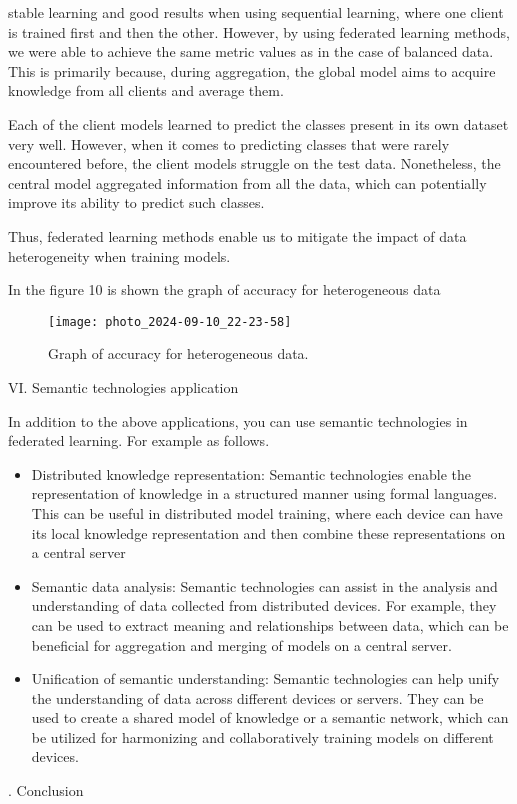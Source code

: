 \documentclass[twocolumn, 10pt]{article}
\newcommand{\RomanNumeralCaps}[1]
    {\MakeUppercase{\romannumeral #1}}
\begin{document}
\noindent stable learning and good results when using sequential %
learning, where one client is trained first and then the
other. However, by using federated learning methods, we
were able to achieve the same metric values as in the
case of balanced data. This is primarily because, during
aggregation, the global model aims to acquire knowledge
from all clients and average them.

Each of the client models learned to predict the classes
present in its own dataset very well. However, when it
comes to predicting classes that were rarely encountered
before, the client models struggle on the test data.
Nonetheless, the central model aggregated information
from all the data, which can potentially improve its ability
to predict such classes.

Thus, federated learning methods enable us to mitigate
the impact of data heterogeneity when training models.

In the figure 10 is shown the graph of accuracy for
heterogeneous data

\begin{figure}[h] %
    \centering
    \texttt{[image: photo\_2024-09-10\_22-23-58]}
    \caption{ Graph of accuracy for heterogeneous data.} 
\end{figure}


\centerline{ VI. Semantic technologies application}

In addition to the above applications, you can use
semantic technologies in federated learning. For example
as follows.
\begin{itemize} %
    \item Distributed knowledge representation: Semantic
    technologies enable the representation of knowledge
    in a structured manner using formal languages. This
    can be useful in distributed model training, where
    each device can have its local knowledge representation and then combine these representations on a
    central server
    \item Semantic data analysis: Semantic technologies can
    assist in the analysis and understanding of data
    collected from distributed devices. For example,
    they can be used to extract meaning and relationships between data, which can be beneficial for
    aggregation and merging of models on a central
    server.
\end{itemize}
\newpage %
\begin{itemize}
    \item Unification of semantic understanding: Semantic
    technologies can help unify the understanding of
    data across different devices or servers. They can
    be used to create a shared model of knowledge
    or a semantic network, which can be utilized for
    harmonizing and collaboratively training models on
    different devices.
\end{itemize}
\begin{center}
\RomanNumeralCaps{7}.  Conclusion
\end{center}
\end{document}

